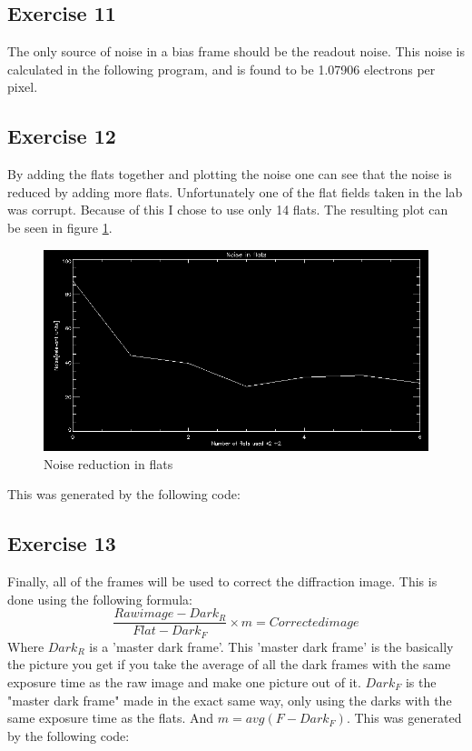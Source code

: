 \documentclass[a4paper,12pt]{article}
\begin{document}
\subsection{Exercise 11}
The only source of noise in a bias frame should be the readout noise. 
This noise is calculated in the following program, and is found to be 1.07906 electrons per pixel.


\subsection{Exercise 12}
By adding the flats together and plotting the noise one can see that the noise is reduced by adding more flats. Unfortunately one of the flat fields taken in the lab was corrupt. Because of this I chose to use only 14 flats. The resulting plot can be seen in figure \ref{fig:noise in flats}.

\begin{figure}[H]
\centering
\includegraphics[width=\textwidth]{Noiseinflats}
\caption{Noise reduction in flats}\label{fig:noise in flats}
\end{figure}
This was generated by the following code:

	
\subsection{Exercise 13}
Finally, all of the frames will be used to correct the diffraction image. This is done using the following formula:
\begin{equation}
\frac{Raw image-Dark_R}{Flat-Dark_F}\times m = Corrected image
\end{equation}
Where $Dark_R$ is a 'master dark frame'. This 'master dark frame' is the basically the picture you get if you take the average of all the dark frames with the same exposure time as the raw image and make one picture out of it. $Dark_F$ is the "master dark frame" made in the exact same way, only using the darks with the same exposure time as the flats. And $m = avg(F-Dark_F)$.
This was generated by the following code:

\end{document}
